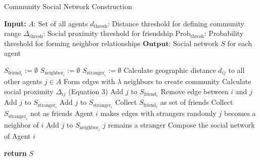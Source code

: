 \begin{algorithm}
\caption{ Community Social Network Construction}
\begin{algorithmic}[1]
\State \textbf{Input:}
\State $A$: Set of all agents
\State $d_{\text{thresh}}$: Distance threshold for defining community range
\State $\Delta_{\text{thresh}}$: Social proximity threshold for friendship
\State $\text{Prob}_{\text{thresh}}$: Probability threshold for forming neighbor relationships
\State $\textbf{Output:}$ Social network $S$ for each agent

    \State $S_{\text{friend}_i} := \emptyset$  
    \State $S_{\text{neighbor}_i} := \emptyset$  
    \State $S_{\text{stranger}_i} := \emptyset$  
    \State Calculate geographic distance $d_{ij}$ to all other agents $j \in A$
        \State Form edges with $\lambda$ neighbors to create community
            \State Calculate social proximity $\Delta_{ij}$ (Equation 3)
                \State Add $j$ to $S_{\text{friend}_i}$
            \Else
                \State Remove edge between $i$ and $j$
                \State Add $j$ to $S_{\text{stranger}_i}$
            \EndIf
        \EndFor
    \Else
        \State Add $j$ to $S_{\text{stranger}_i}$
    \EndIf
    \State Collect $S_{\text{friend}_i}$ as set of friends
    \State Collect $S_{\text{stranger}_i}$ not as friends
    \State Agent $i$ makes edges with strangers randomly
            \State $j$ becomes a neighbor of $i$
            \State Add $j$ to $S_{\text{neighbor}_i}$
        \Else
            \State $j$ remains a stranger
        \EndIf
    \EndFor
    \State Compose the social network of Agent $i$
\EndFor

\State \textbf{return} $S$
\end{algorithmic}
\end{algorithm}

